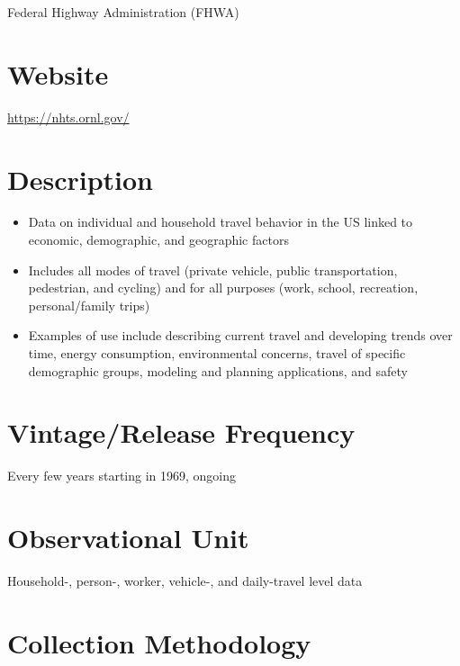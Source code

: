 \documentclass[
]{book}
\providecommand{\tightlist}{%
  \setlength{\itemsep}{0pt}\setlength{\parskip}{0pt}}
\begin{document}
Federal Highway Administration (FHWA)

\hypertarget{website-53}{%
\section{Website}\label{website-53}}

\url{https://nhts.ornl.gov/}

\hypertarget{description-53}{%
\section{Description}\label{description-53}}

\begin{itemize}
\tightlist
\item
  Data on individual and household travel behavior in the US linked to economic, demographic, and geographic factors
\item
  Includes all modes of travel (private vehicle, public transportation, pedestrian, and cycling) and for all purposes (work, school, recreation, personal/family trips)
\item
  Examples of use include describing current travel and developing trends over time, energy consumption, environmental concerns, travel of specific demographic groups, modeling and planning applications, and safety
\end{itemize}

\hypertarget{vintagerelease-frequency-53}{%
\section{Vintage/Release Frequency}\label{vintagerelease-frequency-53}}

Every few years starting in 1969, ongoing

\hypertarget{observational-unit-53}{%
\section{Observational Unit}\label{observational-unit-53}}

Household-, person-, worker, vehicle-, and daily-travel level data

\hypertarget{collection-methodology-53}{%
\section{Collection Methodology}\label{collection-methodology-53}}
\end{document}
